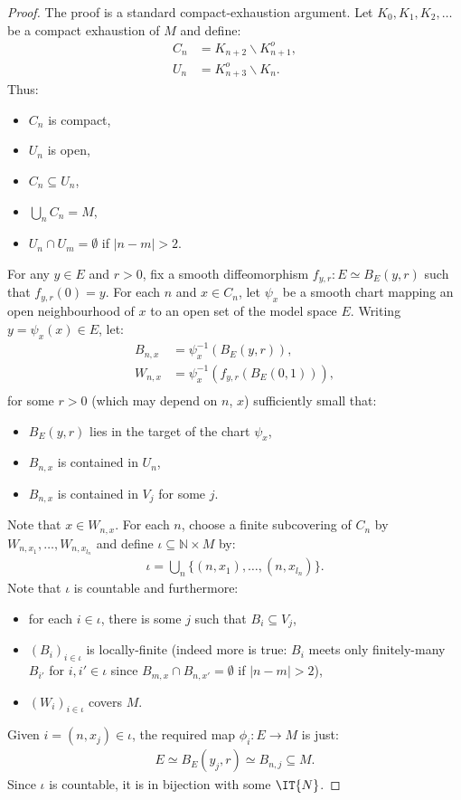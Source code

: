 \begin{proof}
  \leanok
  The proof is a standard compact-exhaustion argument.
  Let $K_0, K_1, K_2, \ldots $ be a compact exhaustion of $M$ and define:
  \begin{align*}
    C_n &= K_{n+2} \smallsetminus K_{n+1}^o,\\
    U_n &= K_{n+3}^o \smallsetminus K_n.
  \end{align*}
  Thus:
  \begin{itemize}
    \item $C_n$ is compact,
    \item $U_n$ is open,
    \item $C_n \subseteq U_n$,
    \item $\bigcup_n C_n = M$,
    \item $U_n \cap U_m = \emptyset$ if $|n - m| > 2$.
  \end{itemize}
  For any $y \in E$ and $r > 0$, fix a smooth diffeomorphism $f_{y,r} : E \simeq B_E(y, r)$ such
  that $f_{y,r}(0) = y$.
  For each $n$ and $x \in C_n$, let $\psi_x$  be a smooth chart mapping an open
  neighbourhood of $x$ to an open set of the model space $E$.
  Writing $y = \psi_x (x) \in E$, let:
  \begin{align*}
    B_{n, x} &= \psi_x^{-1} (B_E(y, r)),\\
    W_{n, x} &= \psi_x^{-1} (f_{y,r} (B_E (0, 1))),\\
  \end{align*}
  for some $r > 0$ (which may depend on $n$, $x$) sufficiently small that:
  \begin{itemize}
    \item $B_E(y, r)$ lies in the target of the chart $\psi_x$,
    \item $B_{n,x}$ is contained in $U_n$,
    \item $B_{n,x}$ is contained in $V_j$ for some $j$.
  \end{itemize}
  Note that $x \in W_{n,x}$. For each $n$, choose a finite subcovering of $C_n$ by
  $W_{n, x_1}, \ldots, W_{n, x_{l_n}}$ and define $\iota \subseteq ℕ \times M$ by:
  \begin{align*}
    \iota = \bigcup_n \{ (n, x_1), \ldots, (n, x_{l_n}) \} .
  \end{align*}
  Note that $\iota$ is countable and furthermore:
  \begin{itemize}
    \item for each $i \in \iota$, there is some $j$ such that $B_i \subseteq V_j$,
    \item $(B_i)_{i \in \iota}$ is locally-finite
    (indeed more is true: $B_i$ meets only finitely-many $B_{i'}$ for $i, i' \in \iota$
    since $B_{m, x} \cap B_{n, x'} = \emptyset$ if $|n - m| > 2$),
    \item $(W_i)_{i \in \iota}$ covers $M$.
  \end{itemize}
  Given $i = (n, x_j) \in \iota$, the required map $\phi_i : E \to M$ is just:
  \begin{align*}
    E \simeq B_E(y_j, r) \simeq B_{n,j} \subseteq M.
  \end{align*}
  Since $ι$ is countable, it is in bijection with some $\IT{N}$.
\end{proof}

